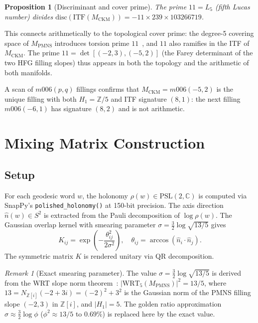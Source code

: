 \documentclass[11pt,a4paper]{article}
\newtheorem{proposition}[theorem]{Proposition}
\theoremstyle{remark}
\newtheorem{remark}[theorem]{Remark}
\newcommand{\MCKM}{M_{\mathrm{CKM}}}
\newcommand{\MPMNS}{M_{\mathrm{PMNS}}}
\newcommand{\Zfive}{\mathbb{Z}/5}
\newcommand{\CC}{\mathbb{C}}
\newcommand{\PSL}{\mathrm{PSL}(2,\CC)}
\begin{document}
\begin{proposition}[Discriminant and cover prime]
The prime $11 = L_5$ (fifth Lucas number) divides
$\mathrm{disc}(\mathrm{ITF}(\MCKM)) = -11\times239\times103266719$.
\end{proposition}

This connects arithmetically to the topological cover prime:
the degree-5 covering space of $\MPMNS$ introduces torsion prime
$11$~\cite{Gentry:Farey}, and $11$ also ramifies in the ITF of $\MCKM$.
The prime $11 = \det[(-2,3),(-5,2)]$ (the Farey determinant of the
two HFG filling slopes) thus appears in both the topology and the
arithmetic of both manifolds.

A scan of $m006(p,q)$ fillings confirms that $\MCKM = m006(-5,2)$
is the unique filling with both $H_1 = \Zfive$ and ITF signature $(8,1)$:
the next filling $m006(-6,1)$ has signature $(8,2)$ and is not arithmetic.

\section{Mixing Matrix Construction}
\label{sec:mixing}

\subsection{Setup}

For each geodesic word $w$, the holonomy $\rho(w) \in \PSL$ is
computed via SnapPy's \texttt{polished\_holonomy()} at 150-bit precision.
The axis direction $\hat{n}(w) \in S^2$ is extracted from the
Pauli decomposition of $\log\rho(w)$.
The Gaussian overlap kernel with smearing parameter
$\sigma = \frac{3}{2}\log\sqrt{13/5}$ gives
\[
K_{ij} = \exp\!\left(-\frac{\theta_{ij}^2}{2\sigma^2}\right),
\quad
\theta_{ij} = \arccos(\hat{n}_i \cdot \hat{n}_j).
\]
The symmetric matrix $K$ is rendered unitary via QR decomposition.

\begin{remark}[Exact smearing parameter]
The value $\sigma = \frac{3}{2}\log\sqrt{13/5}$ is derived from
the WRT slope norm theorem~\cite{Gentry:WRT}:
$|\mathrm{WRT}_5(\MPMNS)|^2 = 13/5$,
where $13 = N_{\mathbb{Z}[i]}(-2+3i) = (-2)^2+3^2$ is the Gaussian norm
of the PMNS filling slope $(-2,3)$ in $\mathbb{Z}[i]$, and $|H_1|=5$.
The golden ratio approximation $\sigma \approx \frac{3}{2}\log\phi$
($\phi^2 \approx 13/5$ to $0.69\%$) is replaced here by the exact value.
\end{remark}
\end{document}
